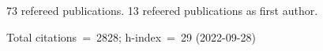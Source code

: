 73 refereed publications. 13 refeered publications as first author.

Total citations~=~2828; h-index~=~29 (2022-09-28)